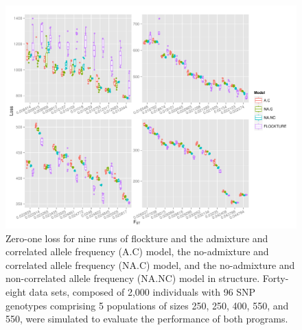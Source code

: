  \begin{figure}
\centering
  \includegraphics[width=.9\linewidth]{images/Figures-Pat/SNPloss.pdf}%
  \caption{Zero-one loss for nine runs of {\sc flockture} and the admixture and correlated allele 
  frequency (A.C) model, the no-admixture and correlated allele frequency (NA.C) model, 
and the no-admixture and non-correlated allele frequency (NA.NC) model in {\sc structure}. Forty-eight 
data sets, composed of 2,000 individuals with 96 SNP genotypes comprising 
5 populations of sizes 250, 250, 400, 550, and 550, were simulated to evaluate the performance
of both programs. }
  \label{fig:SNPloss}
\end{figure} 


